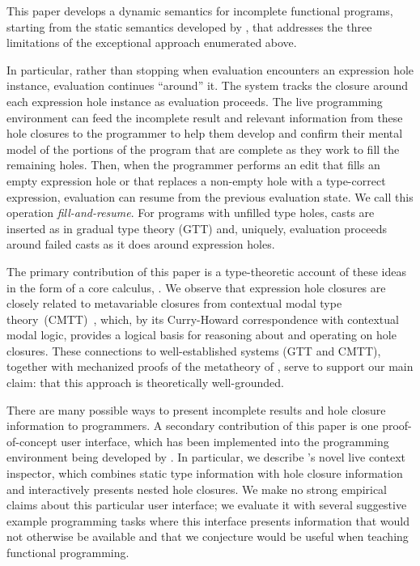 
This paper develops a dynamic semantics for incomplete functional programs, starting from the static semantics developed by \citet{popl-paper},  that addresses the three limitations of the exceptional approach enumerated above.

In particular, rather than stopping when evaluation encounters an expression hole instance, evaluation continues ``around'' it.   
The system tracks the closure around each expression hole instance as evaluation proceeds. The live programming environment can feed the incomplete result and relevant information from these {hole closures} to the programmer to help them develop and confirm their mental model of the portions of the program that are complete as they work to fill the remaining holes. 
Then, when the programmer performs an edit that fills an empty expression hole or that replaces a non-empty hole with a type-correct expression, evaluation can resume from the previous evaluation state. We call this operation \emph{fill-and-resume}. For programs with unfilled type holes, casts are inserted as in gradual type theory (GTT) \cite{DBLP:conf/snapl/SiekVCB15} and, uniquely, evaluation proceeds around failed casts as it does around expression holes. 

The primary contribution of this paper is a type-theoretic account of these ideas in the form of a core calculus, \HazelnutLive. We observe that expression hole closures are closely related to metavariable closures from contextual modal type theory~(CMTT)~\cite{Nanevski2008}, which, by its Curry-Howard correspondence with contextual modal logic, provides a logical basis for reasoning about and operating on hole closures. These connections to well-established systems (GTT and CMTT), together with mechanized proofs of the metatheory of \HazelnutLive, serve to support our main claim: that this approach is theoretically well-grounded.

There are many possible ways to present incomplete results and hole closure information to programmers. A secondary contribution of this paper is one  proof-of-concept user interface, which has been implemented into the \Hazel programming environment being developed by \citet{HazelnutSNAPL}. In particular, we describe \Hazel's novel live context inspector, which  combines static type information with hole closure information and interactively presents nested hole closures. We make no strong empirical claims about this particular user interface; we evaluate it with several suggestive example programming tasks where this interface presents information that would not otherwise be available and that we conjecture would be useful when teaching functional programming.

